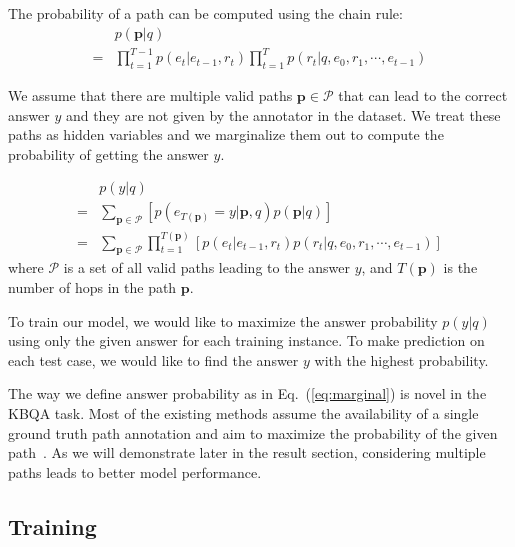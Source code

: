 The probability of a path can be computed using the chain rule:
\begin{align}
&p(\mathbf{p}|q)\nonumber\\
=& \prod_{t=1}^{T-1}p(e_t|e_{t-1},r_t)\prod_{t=1}^{T}p(r_t|q,e_0,r_1,\cdots,e_{t-1}) 
\end{align}

We assume that there are multiple valid paths $\mathbf{p}\in \mathcal{P}$ that can lead to the correct answer $y$ and they are not given by the annotator in the dataset. We treat these paths as hidden variables and we marginalize them out to compute the probability of getting the answer $y$.

\begin{align}
&p(y|q)\nonumber\\
=&\sum_{\mathbf{p}\in\mathcal{P}} [p(e_{T(\mathbf{p})}=y|\mathbf{p},q)p(\mathbf{p}|q)] \nonumber\\
=&\sum_{\mathbf{p}\in\mathcal{P}}\prod_{t=1}^{T(\mathbf{p})} [p(e_t|e_{t-1},r_t) p(r_t|q,e_0,r_1,\cdots,e_{t-1})]
\label{eq:marginal}
\end{align}
where $\mathcal{P}$ is a set of all valid paths leading to the answer $y$, and $T(\mathbf{p})$ is the number of hops in the path $\mathbf{p}$.

To train our model, we would like to maximize the answer probability $p(y|q)$ using only the given answer for each training instance. To make prediction on each test case, we would like to find the answer $y$ with the highest probability.

The way we define answer probability as in Eq.~(\ref{eq:marginal}) is novel in the KBQA task. Most of the existing methods assume the availability of a single ground truth path annotation and aim to maximize the probability of the given path~\cite{DBLP:conf/coling/ZhouHZ18}. As we will demonstrate later in the result section, considering multiple paths leads to better model performance.











\subsection{Training}


